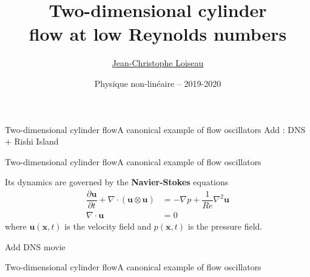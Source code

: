 \documentclass[usenames,dvipsnames,svgnames,10pt,aspectratio=169]{beamer}
\title[Nonlinear physics] %
{
  Two-dimensional cylinder \\
  flow at low Reynolds numbers
}
\author[J.-Ch.~Loiseau] %
{
	\underline{Jean-Christophe Loiseau}
}
\institute[unused]
{
	\url{jean-christophe.loiseau@ensam.eu} \\
	Laboratoire DynFluid \\
	Arts et M\'etiers, France.
}
\date[unused]{Physique non-lin\'eaire -- 2019-2020}
\begin{document}
\titleframe	%


\begin{frame}[t, c]{Two-dimensional cylinder flow}{A canonical example of flow oscillators}
  Add : DNS + Rishi Island
\end{frame}





\begin{frame}[t, c]{Two-dimensional cylinder flow}{A canonical example of flow oscillators}
  \begin{minipage}{.68\textwidth}
    Its dynamics are governed by the \alert{\textbf{Navier-Stokes}} equations
    \[
    \begin{aligned}
      \dfrac{\partial \bm{u}}{\partial t} + \nabla \cdot \left( \bm{u} \otimes \bm{u} \right) & = -\nabla p + \dfrac{1}{Re} \nabla^2 \bm{u} \\
      \nabla \cdot \bm{u} & = 0
    \end{aligned}
    \]
    where $\bm{u}(\bm{x}, t)$ is the velocity field and $p(\bm{x}, t)$ is the pressure field.
  \end{minipage}%
  \hfill
  \begin{minipage}{.28\textwidth}
    Add DNS movie
  \end{minipage}
\end{frame}




\begin{frame}[t, c]{Two-dimensional cylinder flow}{A canonical example of flow oscillators}
  
\end{frame}
\end{document}
